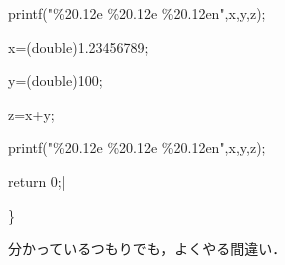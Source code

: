 \documentclass{article}
\begin{document}
\begin{maplegroup}
\begin{Maple Normal}{
printf("\%20.12e \%20.12e \%20.12en",x,y,z);}\end{Maple Normal}

\begin{Maple Normal}{
}\end{Maple Normal}
\begin{Maple Normal}{
x=(double)1.23456789;}\end{Maple Normal}

\begin{Maple Normal}{
y=(double)100;}\end{Maple Normal}

\begin{Maple Normal}{
z=x+y;}\end{Maple Normal}

\begin{Maple Normal}{
printf("\%20.12e \%20.12e \%20.12en",x,y,z);}\end{Maple Normal}

\begin{Maple Normal}{
}\end{Maple Normal}
\begin{Maple Normal}{
return 0;|

\}}\end{Maple Normal}

\begin{Maple Normal}{
}\end{Maple Normal}
\end{maplegroup}
\begin{maplegroup}
\begin{Maple Normal}{
分かっているつもりでも，よくやる間違い．}\end{Maple Normal}

\end{maplegroup}
\end{document}
